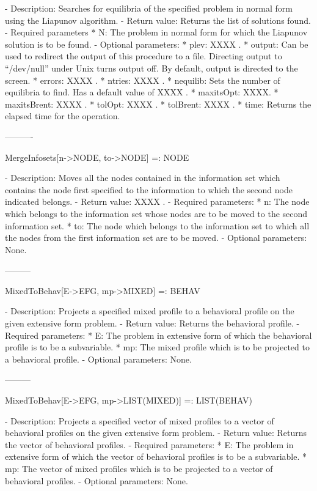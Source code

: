    -	Description:  Searches for equilibria of the specified problem in 
	normal form using the Liapunov algorithm.
   -	Return value:  Returns the list of solutions found.
   -	Required parameters
	  *  N:  The problem in normal form for which the Liapunov solution is 
		to be found.
   -	Optional parameters:
	  *  plev: XXXX .
	  *  output:  Can be used to redirect the output of this procedure to a
		file.  Directing output to ``/dev/null'' under Unix turns 
		output off.  By default, output is directed to the screen.
	  *  errors:  XXXX .
	  *  ntries:  XXXX .
	  *  nequilib:  Sets the number of equilibria to find.  Has a default 
		value of XXXX . 
	  *  maxitsOpt:  XXXX.
	  *  maxitsBrent:  XXXX .
	  *  tolOpt:  XXXX . 
	  *  tolBrent:  XXXX .
	  *  time:  Returns the elapsed time for the operation.

----------

MergeInfosets[n->NODE, to->NODE] =: NODE

   -	Description:  Moves all the nodes contained in the information set 
	which contains the node first specified to the information to which the
	second node indicated belongs.
   -	Return value:  XXXX .
   -	Required parameters:
	  *  n:  The node which belongs to the information set whose nodes are
		to be moved to the second information set.
	  *  to:  The node which belongs to the information set to which all
		the nodes from the first information set are to be moved.
   -	Optional parameters:  None.

---------

MixedToBehav[E->EFG, mp->MIXED] =: BEHAV

   -	Description:  Projects a specified mixed profile to a behavioral 
	profile on the given extensive form problem.
   -	Return value:  Returns the behavioral profile.
   -	Required parameters:
	  *  E:  The problem in extensive form of which the behavioral profile
		is to be a subvariable.
	  *  mp:  The mixed profile which is to be projected to a behavioral
		profile.
   -	Optional parameters:  None.

---------

MixedToBehav[E->EFG, mp->LIST(MIXED)] =: LIST(BEHAV)

   -	Description:  Projects a specified vector of mixed profiles to a vector
	of behavioral profiles on the given extensive form problem.
   -	Return value:  Returns the vector of behavioral profiles.
   -	Required parameters:
	  *  E:  The problem in extensive form of which the vector of 
		behavioral profiles is to be a subvariable.
	  *  mp:  The vector of mixed profiles which is to be projected to a 
		vector of behavioral profiles.
   -	Optional parameters:  None.

